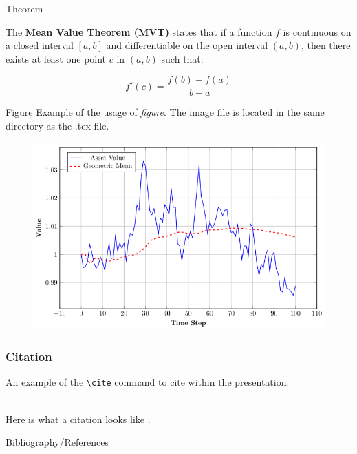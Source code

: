 \documentclass[aspectratio=169,xcolor=dvipsnames]{beamer}
\begin{document}
\begin{frame}{Theorem}
    \begin{theorem}
The \textbf{Mean Value Theorem (MVT)} states that if a function \( f \) is continuous on a closed interval \( [a,b] \) and differentiable on the open interval \( (a,b) \), then there exists at least one point \( c \) in \( (a,b) \) such that:

\[
f'(c) = \frac{f(b) - f(a)}{b - a}
\]
    \end{theorem}
\end{frame}


\begin{frame}{Figure}
    Example of the usage of \textit{figure}. The image file is located in the same directory as the .tex file.
    \begin{figure}
    \includegraphics[width=0.6\linewidth]{examples/novabeamer-example-image.png.png}
    \end{figure}
\end{frame}


\begin{frame}[fragile] %
    \frametitle{Citation}
    An example of the \verb|\cite| command to cite within the presentation:\\~

    Here is what a citation looks like \cite{p1}.
\end{frame}


\begin{frame}{Bibliography/References}
    \nocite{*}
    \footnotesize
    
    
\end{frame}


\begin{frame}
\centering
    \vspace*{\fill}
\end{frame}

\end{document}
